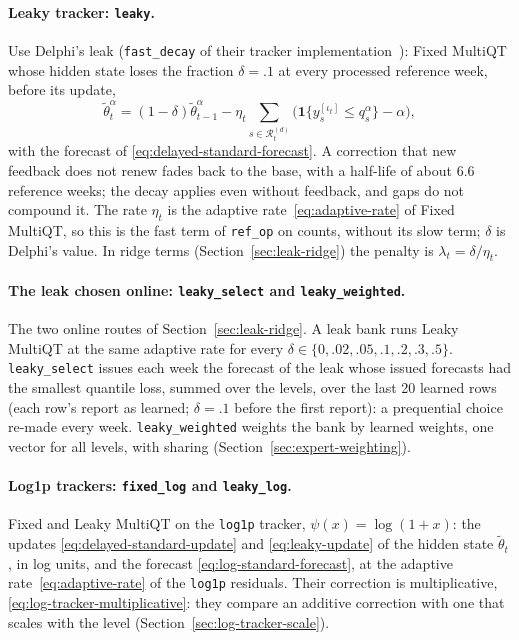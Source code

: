 \documentclass[11pt,a4paper]{article}
\newcommand{\ind}{\mathbf{1}}
\theoremstyle{definition}
\theoremstyle{remark}
\begin{document}
\paragraph{Leaky tracker: \texttt{leaky}.}
Use Delphi's leak (\texttt{fast\_decay} of their tracker
implementation~\cite{delphi-calibration}): Fixed MultiQT whose hidden
state loses the fraction $\delta=.1$ at every processed reference week,
before its update,
\begin{equation}
 \tilde\theta_t^\alpha
 =(1-\delta)\tilde\theta_{t-1}^\alpha-\eta_t
   \sum_{s\in\mathcal R_t^{(d)}}
   \bigl(\ind\{y_s^{[\iota_t]}\le q_s^\alpha\}-\alpha\bigr),
 \label{eq:leaky-update}
\end{equation}
with the forecast of \eqref{eq:delayed-standard-forecast}. A correction
that new feedback does not renew fades back to the base, with a
half-life of about 6.6 reference weeks; the decay applies even without
feedback, and gaps do not compound it. The rate $\eta_t$ is the adaptive
rate~\eqref{eq:adaptive-rate} of Fixed MultiQT, so this is the fast term
of \texttt{ref\_op} on counts, without its slow term; $\delta$ is
Delphi's value. In ridge terms (Section~\ref{sec:leak-ridge}) the penalty
is $\lambda_t=\delta/\eta_t$.

\paragraph{The leak chosen online: \texttt{leaky\_select} and
\texttt{leaky\_weighted}.} The two online routes of
Section~\ref{sec:leak-ridge}. A leak bank runs Leaky MultiQT at the same
adaptive rate for every $\delta\in\{0,.02,.05,.1,.2,.3,.5\}$.
\texttt{leaky\_select} issues each week the forecast of the leak whose
issued forecasts had the smallest quantile loss, summed over the levels,
over the last 20 learned rows (each row's report as learned; $\delta=.1$
before the first report): a prequential choice re-made every week.
\texttt{leaky\_weighted} weights the bank by learned weights, one vector
for all levels, with sharing (Section~\ref{sec:expert-weighting}).

\paragraph{Log1p trackers: \texttt{fixed\_log} and \texttt{leaky\_log}.}
Fixed and Leaky MultiQT on the \texttt{log1p} tracker,
$\psi(x)=\log(1+x)$: the updates \eqref{eq:delayed-standard-update} and
\eqref{eq:leaky-update} of the hidden state $\tilde\theta_t$, in log
units, and the forecast \eqref{eq:log-standard-forecast}, at the adaptive
rate~\eqref{eq:adaptive-rate} of the \texttt{log1p} residuals. Their
correction is
multiplicative, \eqref{eq:log-tracker-multiplicative}: they compare an
additive correction with one that scales with the level
(Section~\ref{sec:log-tracker-scale}).
\end{document}
